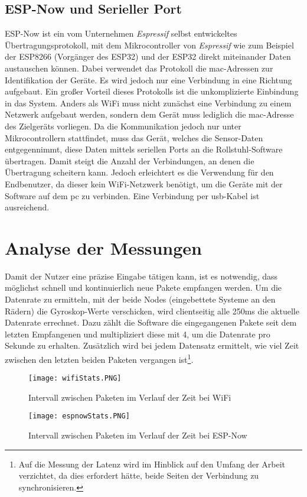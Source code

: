 \subsection{ESP-Now und Serieller Port}
ESP-Now ist ein vom Unternehmen \textit{Espressif} selbst entwickeltes Übertragungsprotokoll, mit dem Mikrocontroller von \textit{Espressif} wie zum Beispiel der ESP8266 (Vorgänger des ESP32) und der ESP32 direkt miteinander Daten austauschen können\cite{ESPNowUserGuide2016}.
Dabei verwendet das Protokoll die \ac{mac}-Adressen zur Identifikation der Geräte.
Es wird jedoch nur eine Verbindung in eine Richtung aufgebaut.
Ein großer Vorteil dieses Protokolls ist die unkomplizierte Einbindung in das System.
Anders als WiFi muss nicht zunächst eine Verbindung zu einem Netzwerk aufgebaut werden, sondern dem Gerät muss lediglich die \ac{mac}-Adresse des Zielgeräts vorliegen.
Da die Kommunikation jedoch nur unter Mikrocontrollern stattfindet, muss das Gerät, welches die Sensor-Daten entgegennimmt, diese Daten mittels seriellen Ports an die Rollstuhl-Software übertragen.
Damit steigt die Anzahl der Verbindungen, an denen die Übertragung scheitern kann.
Jedoch erleichtert es die Verwendung für den Endbenutzer, da dieser kein WiFi-Netzwerk benötigt, um die Geräte mit der Software auf dem \ac{pc} zu verbinden.
Eine Verbindung per \ac{usb}-Kabel ist ausreichend.

\section{Analyse der Messungen}
Damit der Nutzer eine präzise Eingabe tätigen kann, ist es notwendig, dass möglichst schnell und kontinuierlich neue Pakete empfangen werden.
Um die Datenrate zu ermitteln, mit der beide Nodes (eingebettete Systeme an den Rädern) die Gyroskop-Werte verschicken, wird clientseitig alle 250ms die aktuelle Datenrate errechnet.
Dazu zählt die Software die eingegangenen Pakete seit dem letzten Empfangenen und multipliziert diese mit 4, um die Datenrate pro Sekunde zu erhalten.
Zusätzlich wird bei jedem Datensatz ermittelt, wie viel Zeit zwischen den letzten beiden Paketen vergangen ist\footnote{Auf die Messung der Latenz wird im Hinblick auf den Umfang der Arbeit verzichtet, da dies erfordert hätte, beide Seiten der Verbindung zu synchronisieren.}.

\begin{figure}[h]
    \centering
    \texttt{[image: wifiStats.PNG]}
    \caption{Intervall zwischen Paketen im Verlauf der Zeit bei WiFi}
    \label{fig:wifiStats}
\end{figure}
\begin{figure}[h]
    \centering
    \texttt{[image: espnowStats.PNG]}
    \caption{Intervall zwischen Paketen im Verlauf der Zeit bei ESP-Now}
    \label{fig:espnowStats}
\end{figure}

